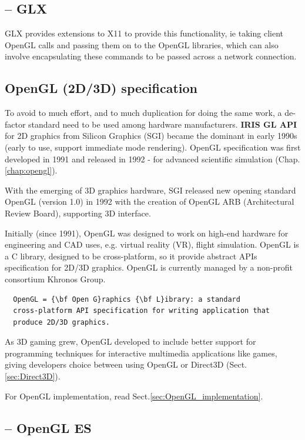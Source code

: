 \subsection{ -- GLX}

GLX provides extensions to X11 to provide this functionality, ie taking client
OpenGL calls and passing them on to the OpenGL libraries, which can also involve
encapsulating these commands to be passed across a network connection.


\subsection{OpenGL (2D/3D) specification}
\label{sec:OpenGL}

To avoid to much effort, and to much duplication for doing the same work, a
de-factor standard need to be used among hardware manufacturers. {\bf IRIS GL
API} for 2D graphics from Silicon Graphics (SGI) became the dominant in early
1990s (early to use, support immediate mode rendering).
OpenGL specification was first developed in 1991 and released in 1992 - for
advanced scientific simulation (Chap.\ref{chap:opengl}).

With the emerging of 3D graphics hardware, SGI released new opening
standard OpenGL (version 1.0) in 1992 with the creation of OpenGL ARB
(Architectural Review Board), supporting 3D interface.

Initially (since 1991), OpenGL was designed to work on high-end hardware for
engineering and CAD uses, e.g. virtual reality (VR), flight simulation. OpenGL
is a C library, designed to be cross-platform, so it provide abstract APIs
specification for 2D/3D graphics. OpenGL is currently managed by a non-profit
consortium Khronos Group.
\begin{Verbatim}
  OpenGL = {\bf Open G}raphics {\bf L}ibrary: a standard
  cross-platform API specification for writing application that
  produce 2D/3D graphics.
\end{Verbatim}

As 3D gaming grew, OpenGL developed to include better support for programming
techniques for interactive multimedia applications like games, giving developers
choice between using OpenGL or Direct3D (Sect.\ref{sec:Direct3D}).

For OpenGL implementation, read Sect.\ref{sec:OpenGL_implementation}.


\subsection{-- OpenGL ES}
\label{sec:OpenGL-ES}


